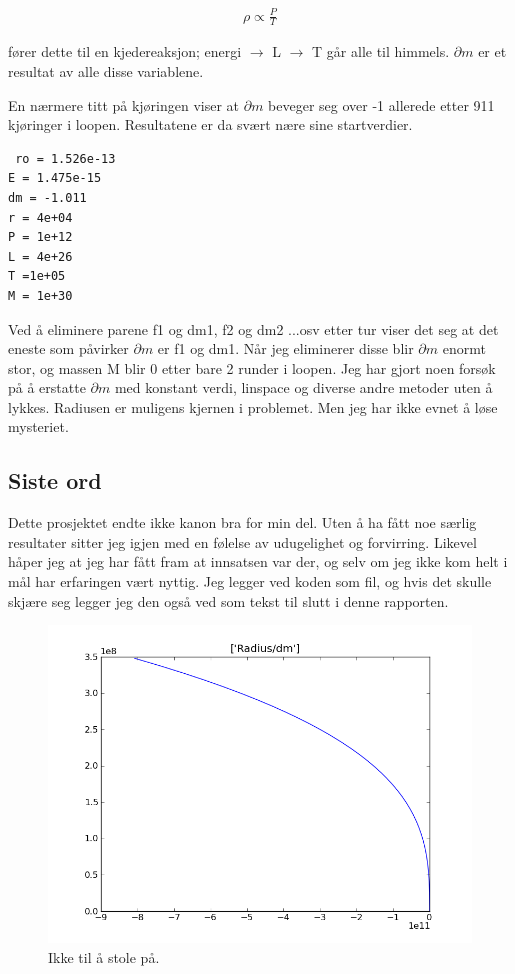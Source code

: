 \documentclass[norsk,a4paper,12pt]{article}
\begin{document}
\begin{align*}
 \rho \propto \frac{P}{T}
\end{align*}

fører dette til en kjedereaksjon; energi $\rightarrow $ L $\rightarrow $ T går alle til himmels.
$\partial m $ er et resultat av alle disse variablene. 

En nærmere titt på kjøringen viser at $\partial m $ beveger seg over -1 allerede etter 911 kjøringer i loopen. Resultatene 
er da svært nære sine startverdier.

\begin{lstlisting}
 ro = 1.526e-13
E = 1.475e-15
dm = -1.011
r = 4e+04
P = 1e+12
L = 4e+26
T =1e+05
M = 1e+30
\end{lstlisting}

Ved å eliminere parene f1 og dm1, f2 og dm2 ...osv etter tur viser det seg at det eneste som påvirker $\partial m $ 
er f1 og dm1. Når jeg eliminerer disse blir $\partial m $ enormt stor, og massen M blir 0 etter bare 2 runder i 
loopen. 
Jeg har gjort noen forsøk på å erstatte $\partial m $ med konstant verdi, linspace og diverse andre metoder uten å
lykkes. 
Radiusen er muligens kjernen i problemet. Men jeg har ikke evnet å løse mysteriet.

\subsection{Siste ord}

Dette prosjektet endte ikke kanon bra for min del. Uten å ha fått noe særlig resultater sitter jeg igjen med en 
følelse av udugelighet og forvirring.
 Likevel håper jeg at jeg har fått fram at innsatsen var der, og selv om jeg ikke kom helt i mål har erfaringen 
vært nyttig. Jeg legger ved koden som fil, og hvis det skulle skjære seg legger jeg den også ved som tekst til slutt
 i denne rapporten. 

\begin{figure}[H] 
\begin{center} 
\includegraphics[scale=0.5]{r_dm.png} 
 

\caption{Ikke til å stole på.} 
\end{center} 
\end{figure}
\end{document}
